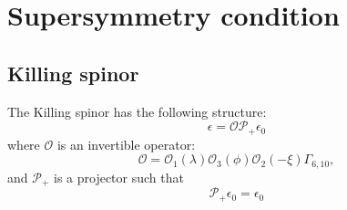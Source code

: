 \section{Supersymmetry condition}



\subsection{Killing spinor}
The Killing spinor has the following structure:
\begin{equation}
\epsilon = \mathcal{O} \mathcal{P}_+ \epsilon_0
\end{equation}{}
where $\mathcal{O}$ is an invertible operator:
\begin{equation}
    \mathcal{O} 
    =\mathcal{O}_1(\lambda)\mathcal{O}_3(\phi)\mathcal{O}_2(-\xi)\Gamma_{6,10},
\end{equation}{}
and $\mathcal{P}_+$ is a projector such that
\begin{equation}
    \mathcal{P}_+ \epsilon_0 =  \epsilon_0
\end{equation}{}

